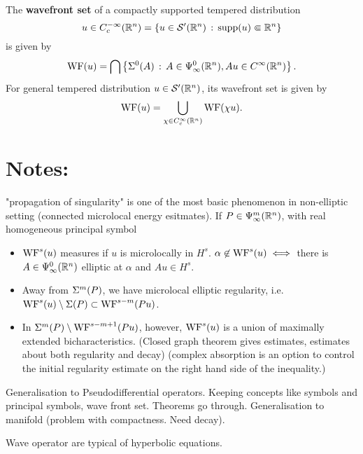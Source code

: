 \documentclass{article}
\begin{document}
\begin{fdefinition}
    The \textbf{wavefront set} of a compactly supported tempered distribution 
    \[
    u \in C^{-\infty}_c({\mathbb R}^n) = \left\{u \in \mathcal{S}'({\mathbb R}^n) \, : \, \mathrm{supp}(u) \Subset {\ensuremath {\mathbb R}}^n\right\} 
    \]
    is given by 
    \begin{align*}
    \mathrm{WF}(u) = \bigcap \left\{\Sigma^0(A) \, : \, A \in \Psi^0_\infty({\mathbb R}^n), Au \in C^\infty({\mathbb R}^n)\right\}. 
    \end{align*}
    For general tempered distribution $u \in \mathcal{S}'({\mathbb R}^n)$, its wavefront set is given by 
    \begin{align*}
    \mathrm{WF}(u) = \bigcup_{\chi \in C^\infty_c({\mathbb R}^n)} \mathrm{WF}(\chi u). 
    \end{align*}
\end{fdefinition} 




\pagebreak 
\appendix
\section{Notes:}
"propagation of singularity" is one of the most basic phenomenon in non-elliptic setting (connected microlocal energy esitmates). If $P \in \Psi^{m}_{\infty}({\mathbb R}^n)$, with real homogeneous principal symbol
\begin{itemize}
    \item $\mathrm{WF}^s(u)$ measures if $u$ is microlocally in $H^s$. $\alpha \not \in \mathrm{WF}^s(u) \iff $ there is $A \in \Psi^{0}_{\infty}({\mathbb R}^n)$ elliptic at $\alpha$ and $Au \in H^s$. 
    \item Away from $\Sigma^m(P)$, we have microlocal elliptic regularity, i.e. $\mathrm{WF}^s(u) \setminus \Sigma(P) \subset \mathrm{WF}^{s - m}(Pu)$. 
    \item In $\Sigma^m(P) \setminus \mathrm{WF}^{s - m + 1}(Pu)$, however, $\mathrm{WF}^s(u)$ is a union of maximally extended bicharacteristics. (Closed graph theorem gives estimates, estimates about both regularity and decay) (complex absorption is an option to control the initial regularity estimate on the right hand side of the inequality.)
\end{itemize}


Generalisation to Pseudodifferential operators. Keeping concepts like symbols and principal symbols, wave front set. Theorems go through. Generalisation to manifold (problem with compactness. Need decay). 

Wave operator are typical of hyperbolic equations. 
\end{document}
